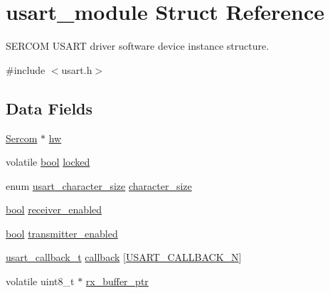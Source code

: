 \hypertarget{structusart__module}{}\section{usart\+\_\+module Struct Reference}
\label{structusart__module}


S\+E\+R\+C\+OM U\+S\+A\+RT driver software device instance structure.  




{\ttfamily \#include $<$usart.\+h$>$}

\subsection*{Data Fields}
\begin{DoxyCompactItemize}
\item 
\mbox{\hyperlink{union_sercom}{Sercom}} $\ast$ \mbox{\hyperlink{structusart__module_a0c1e47f7408dce5f667a53398c82d13a}{hw}}
\item 
volatile \mbox{\hyperlink{group__group__sam0__utils_ga97a80ca1602ebf2303258971a2c938e2}{bool}} \mbox{\hyperlink{structusart__module_a765892434f9329ded45a5287eeb75957}{locked}}
\item 
enum \mbox{\hyperlink{group__asfdoc__sam0__sercom__usart__group_ga631ce7b4f60dccd392e6d6ef7d3cd4e2}{usart\+\_\+character\+\_\+size}} \mbox{\hyperlink{structusart__module_a30702e47861220f8092295e86df57e3b}{character\+\_\+size}}
\item 
\mbox{\hyperlink{group__group__sam0__utils_ga97a80ca1602ebf2303258971a2c938e2}{bool}} \mbox{\hyperlink{structusart__module_aa555f88ee76a65a51c526b3e912b711d}{receiver\+\_\+enabled}}
\item 
\mbox{\hyperlink{group__group__sam0__utils_ga97a80ca1602ebf2303258971a2c938e2}{bool}} \mbox{\hyperlink{structusart__module_a4502b69abc393bd7a0217d1bdd28a200}{transmitter\+\_\+enabled}}
\item 
\mbox{\hyperlink{group__asfdoc__sam0__sercom__usart__group_ga1d3e2901d0cf76f20aae271f7122c67d}{usart\+\_\+callback\+\_\+t}} \mbox{\hyperlink{structusart__module_acb4f50636ea728b711008ba58b2e3ecc}{callback}} \mbox{[}\mbox{\hyperlink{group__asfdoc__sam0__sercom__usart__group_ggae257d5c9ac64a6835db020aa2458439dad6e55cb6f0f87b63292fe063d76405b5}{U\+S\+A\+R\+T\+\_\+\+C\+A\+L\+L\+B\+A\+C\+K\+\_\+N}}\mbox{]}
\item 
volatile uint8\+\_\+t $\ast$ \mbox{\hyperlink{structusart__module_a20cb7f37889a2de5bcd383a2257905f4}{rx\+\_\+buffer\+\_\+ptr}}
\item 

\end{DoxyCompactItemize}
